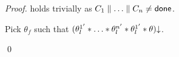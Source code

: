 {\begin{proof}

  holds trivially as $C_1 \parallel \ldots \parallel C_n \neq {\sf done}$.

Pick $\theta_f$ such that $(\theta_l^{1'} * \ldots * \theta_l^{n'} * \theta_l^{1'} * \theta)\mathpunct{\downarrow}$.



\qed\end{proof}











}
